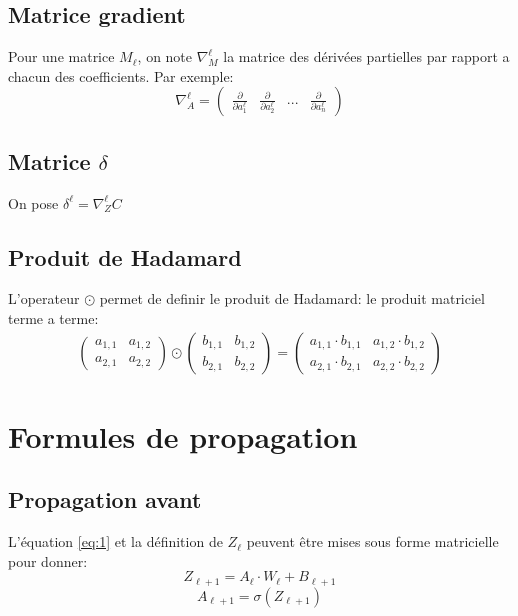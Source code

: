 \documentclass[10pt,a4paper,titlepage]{article}
\begin{document}
\subsection{Matrice gradient}
Pour une matrice $M_{\ell}$, on note $\nabla_M^{\ell}$ la matrice des dérivées partielles par rapport a chacun des coefficients.
Par exemple: 
\[\nabla_A^{\ell} = \begin{pmatrix} \frac{\partial}{\partial a_1^\ell} & \frac{\partial}{\partial a_2^\ell} & ... & \frac{\partial}{\partial a_n^\ell} \end{pmatrix}\]

\subsection{Matrice $\delta$}
On pose $\delta^{\ell} = \nabla_Z^{\ell}C$

\subsection{Produit de Hadamard}
L'operateur $\odot$ permet de definir le produit de Hadamard: le produit matriciel terme a terme:
\begin{align*}
\begin{pmatrix} a_{1,1} & a_{1,2} \\
a_{2,1} & a_{2,2}
\end{pmatrix}
\odot
\begin{pmatrix} b_{1,1} & b_{1,2} \\
b_{2,1} & b_{2,2}
\end{pmatrix}=
\begin{pmatrix} a_{1,1} \cdot b_{1,1} & a_{1,2} \cdot b_{1,2} \\
a_{2,1} \cdot b_{2,1} & a_{2,2} \cdot b_{2,2}
\end{pmatrix}
\end{align*}

\section{Formules de propagation}
\subsection{Propagation avant}
L'équation \eqref{eq:1} et la définition de $Z_{\ell}$ peuvent être mises sous forme matricielle pour donner:
\begin{equation}
\label{fp1}
Z_{\ell+1}= A_\ell \cdot W_\ell+B_{\ell+1}
\end{equation}
\begin{equation}
\label{fp2}
A_{\ell+1}= \sigma(Z_{\ell+1})
\end{equation}
\end{document}
